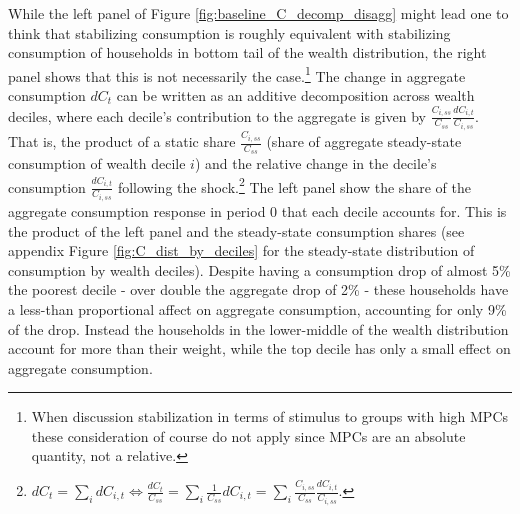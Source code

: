 While the left panel of Figure \ref{fig:baseline_C_decomp_disagg} might lead one to think that stabilizing consumption is roughly equivalent with stabilizing consumption of households in bottom tail of the wealth distribution, the right panel shows that this is not necessarily the case.\footnote{When discussion stabilization in terms of stimulus to groups with high MPCs these consideration of course do not apply since MPCs are an absolute quantity, not a relative.} The change in aggregate consumption $dC_t$ can be written as an additive decomposition across wealth deciles, where each decile's contribution to the aggregate is given by $\frac{C_{i,ss}}{C_{ss}}\frac{dC_{i,t}}{C_{i,ss}}$. That is, the product of a static share $\frac{C_{i,ss}}{C_{ss}}$ (share of aggregate steady-state consumption of wealth decile $i$) and the relative change in the decile's consumption $\frac{dC_{i,t}}{C_{i,ss}}$ following the shock.\footnote{$dC_{t}=\sum_{i}dC_{i,t}\Leftrightarrow\frac{dC_{t}}{C_{ss}}=\sum_{i}\frac{1}{C_{ss}}dC_{i,t}=\sum_{i}\frac{C_{i,ss}}{C_{ss}}\frac{dC_{i,t}}{C_{i,ss}}$.} The left panel show the share of the aggregate consumption response in period 0 that each decile accounts for. This is the product of the left panel and the steady-state consumption shares (see appendix Figure \ref{fig:C_dist_by_deciles} for the steady-state distribution of consumption by wealth deciles). %
Despite having a consumption drop of almost 5\% the poorest decile - over double the aggregate drop of 2\% - these households have a less-than proportional affect on aggregate consumption, accounting for only 9\% of the drop. Instead the households in the lower-middle of the wealth distribution account for more than their weight, while the top decile has only a small effect on aggregate consumption. 




